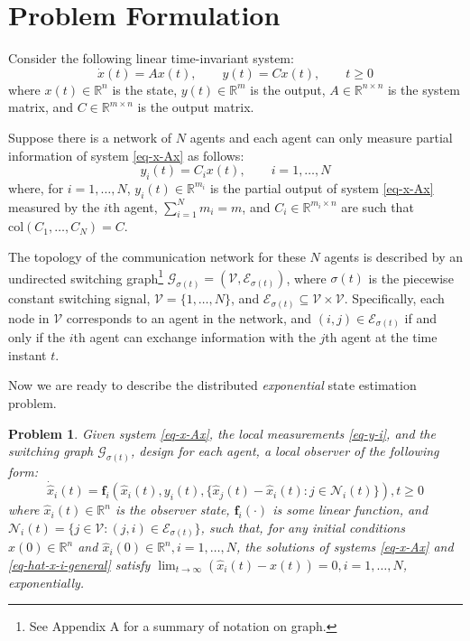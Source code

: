 \documentclass[twocolumn]{autart}
\newcommand{\RR}{\mathbb{R}}
\newtheorem{Problem}{Problem}
\begin{document}
\section{Problem Formulation}\label{Section_Problem_Formulation}
Consider the following linear time-invariant system:
\begin{equation}\label{eq-x-Ax}
    \dot{x}(t)=Ax(t), \qquad y(t)=Cx(t), \qquad t\ge 0
\end{equation}
where $x(t)\in \RR^{n}$ is the state,
$y(t)\in \RR^{m}$ is the output,
$A\in \RR^{n\times n}$ is the system matrix,
and $C\in \RR^{m \times n}$ is the output matrix.



Suppose there is a network of $N$ agents and each agent can only measure partial information of system \eqref{eq-x-Ax} as follows:
\begin{equation}\label{eq-y-i}
    y_{i}(t)=C_{i}x(t), \qquad i=1,\ldots,N
\end{equation}
where, for $i=1,\ldots,N$,
$y_{i}(t)\in \RR^{m_{i}}$ is the partial output of system \eqref{eq-x-Ax} measured by the $i$th agent,
$\sum_{i=1}^{N}m_{i}=m$, and
$C_{i}\in \RR^{m_{i}\times n}$ are such that $\text{col}(C_{1}, \ldots, C_{N})=C$.


The topology of the communication network for these $N$ agents is described by
an undirected switching graph\footnote{See Appendix A for a summary of notation on graph.}
$\mathcal{G}_{\sigma(t)}=(\mathcal{V},\mathcal{E}_{\sigma(t)})$,
where $\sigma(t)$ is the piecewise constant switching signal,
$\mathcal{V}=\{1,\ldots,N\}$, and $\mathcal{E}_{\sigma(t)}\subseteq \mathcal{V}\times \mathcal{V}$.
Specifically, each node in $\mathcal{V}$ corresponds to an agent in the network,
and $(i,j)\in \mathcal{E}_{\sigma(t)}$ if and only if the $i$th agent can exchange information with the $j$th agent at the time instant $t$.



Now we are ready to describe the distributed \emph{exponential} state estimation problem.


\begin{Problem}\label{Problem}
  Given system \eqref{eq-x-Ax}, the local measurements \eqref{eq-y-i},
  and the switching graph $\mathcal{G}_{\sigma(t)}$,
  design for each agent, a local observer of the following form:
  \begin{equation}\label{eq-hat-x-i-general}
    \dot{\hat{x}}_{i}(t)=\mathbf{f}_{i}\left(\hat{x}_{i}(t),y_{i}(t),\{\hat{x}_{j}(t)-\hat{x}_{i}(t): j \in \mathcal{N}_{i}(t)\}\right),
     t\ge 0
  \end{equation}
  where $\hat{x}_{i}(t) \in \RR^{n}$ is the observer state, $\mathbf{f}_{i}(\cdot)$ is some linear function,
  and $\mathcal{N}_{i}(t)=\{j \in \mathcal{V} : (j,i) \in \mathcal{E}_{\sigma(t)}\}$,
  such that, for any initial conditions $x(0)\in \RR^{n}$ and $\hat{x}_{i}(0)\in \RR^{n}, i=1,\ldots,N$,
  the solutions of systems \eqref{eq-x-Ax} and \eqref{eq-hat-x-i-general} satisfy
  $\lim_{t\to\infty}(\hat{x}_{i}(t)-x(t))=0, i=1,\ldots,N$, exponentially.
\end{Problem}
\end{document}
